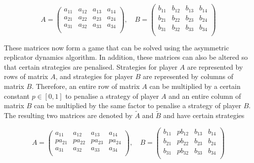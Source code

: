 \begin{equation}
    A = 
    \begin{pmatrix}
        a_{11} & a_{12} & a_{13} & a_{14} \\
        a_{21} & a_{22} & a_{23} & a_{24} \\
        a_{31} & a_{32} & a_{33} & a_{34} \\    
    \end{pmatrix}, \quad
    B = 
    \begin{pmatrix}
        b_{11} & b_{12} & b_{13} & b_{14} \\
        b_{21} & b_{22} & b_{23} & b_{24} \\
        b_{31} & b_{32} & b_{33} & b_{34} \\    
    \end{pmatrix}
\end{equation}

These matrices now form a game that can be solved using the asymmetric
replicator dynamics algorithm.
In addition, these matrices can also be altered so that certain strategies are
penalised.
Strategies for player \(A\) are represented by rows of matrix \(A\), and
strategies for player \(B\) are represented by columns of matrix \(B\).
Therefore, an entire row of matrix \(A\) can be multiplied by a certain
constant \(p \in [0, 1]\) to penalise a strategy of player \(A\) and an entire
column of matrix \(B\) can be multiplied by the same factor to penalise a
strategy of player \(B\).
The resulting two matrices are denoted by \(\tilde{A}\) and \(\tilde{B}\) and
have certain strategies 

\begin{equation}
    A = 
    \begin{pmatrix}
        a_{11}   & a_{12}   & a_{13}   & a_{14}   \\
        p a_{21} & p a_{22} & p a_{23} & p a_{24} \\
        a_{31}   & a_{32}   & a_{33}   & a_{34}   \\    
    \end{pmatrix}, \quad
    B = 
    \begin{pmatrix}
        b_{11} & p b_{12} & b_{13} & b_{14} \\
        b_{21} & p b_{22} & b_{23} & b_{24} \\
        b_{31} & p b_{32} & b_{33} & b_{34} \\    
    \end{pmatrix}
\end{equation}

